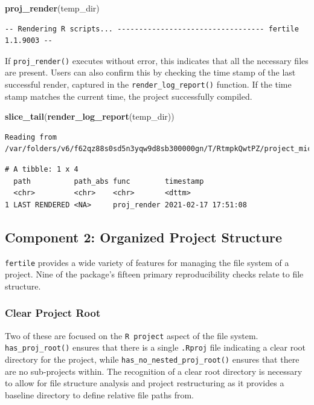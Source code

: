 \documentclass[12pt,twoside]{reedthesis}
\newenvironment{Shaded}{\begin{snugshade}}{\end{snugshade}}
\newcommand{\KeywordTok}[1]{\textcolor[rgb]{0.13,0.29,0.53}{\textbf{#1}}}
\newcommand{\NormalTok}[1]{#1}
\begin{document}
\begin{Shaded}
\begin{Highlighting}[]
\KeywordTok{proj_render}\NormalTok{(temp_dir)}
\end{Highlighting}
\end{Shaded}
\begin{verbatim}
-- Rendering R scripts... ---------------------------------- fertile 1.1.9003 --
\end{verbatim}
If \texttt{proj\_render()} executes without error, this indicates that all the necessary files are present. Users can also confirm this by checking the time stamp of the last successful render, captured in the \texttt{render\_log\_report()} function. If the time stamp matches the current time, the project successfully compiled.
\begin{Shaded}
\begin{Highlighting}[]
\KeywordTok{slice_tail}\NormalTok{(}\KeywordTok{render_log_report}\NormalTok{(temp_dir))}
\end{Highlighting}
\end{Shaded}
\begin{verbatim}
Reading from /var/folders/v6/f62qz88s0sd5n3yqw9d8sb300000gn/T/RtmpkQwtPZ/project_miceps/.fertile_render_log.csv
\end{verbatim}
\begin{verbatim}
# A tibble: 1 x 4
  path          path_abs func        timestamp          
  <chr>         <chr>    <chr>       <dttm>             
1 LAST RENDERED <NA>     proj_render 2021-02-17 17:51:08
\end{verbatim}
\hypertarget{component-2-organized-project-structure}{%
\subsection{Component 2: Organized Project Structure}\label{component-2-organized-project-structure}}

\texttt{fertile} provides a wide variety of features for managing the file system of a project. Nine of the package's fifteen primary reproducibility checks relate to file structure.

\hypertarget{clear-project-root}{%
\subsubsection{Clear Project Root}\label{clear-project-root}}

Two of these are focused on the \texttt{R\ project} aspect of the file system. \texttt{has\_proj\_root()} ensures that there is a single \texttt{.Rproj} file indicating a clear root directory for the project, while \texttt{has\_no\_nested\_proj\_root()} ensures that there are no sub-projects within. The recognition of a clear root directory is necessary to allow for file structure analysis and project restructuring as it provides a baseline directory to define relative file paths from.
\end{document}
